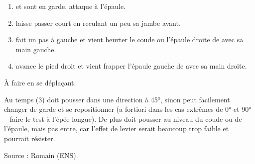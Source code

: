 \begin{exercice}

\begin{enumerate}
	\item \A et \D sont en garde. \A attaque \D à l'épaule.
	
	\item \D laisse passer court en reculant un peu sa jambe avant.
	
	\item \D fait un pas à gauche et vient heurter le coude ou l'épaule droite de \A avec sa main gauche.
	
	\item \D avance le pied droit et vient frapper l'épaule gauche de \A avec sa main droite.
\end{enumerate}

À faire en se déplaçant.

Au temps (3) \D doit pousser dans une direction à 45°, sinon \A peut facilement changer de garde et se repositionner (a fortiori dans les cas extrêmes de 0° et 90° – faire le test à l'épée longue).
De plus \D doit pousser au niveau du coude ou de l'épaule, mais pas entre, car l'effet de levier serait beaucoup trop faible et \A pourrait résister.

Source : Romain (ENS).

\end{exercice}
